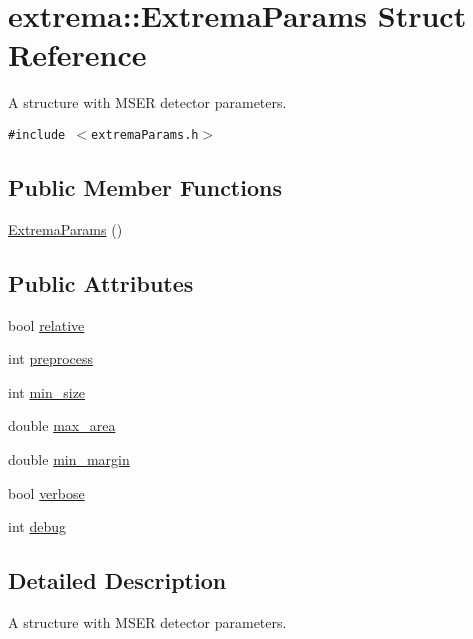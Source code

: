 \hypertarget{structextrema_1_1ExtremaParams}{
\section{extrema::Extrema\-Params Struct Reference}
\label{structextrema_1_1ExtremaParams}
}
A structure with MSER detector parameters.  


{\tt \#include $<$extrema\-Params.h$>$}

\subsection*{Public Member Functions}
\begin{CompactItemize}
\item 
\hyperlink{structextrema_1_1ExtremaParams_8dbdb72d6460a8597dcb5ac435c65e6c}{Extrema\-Params} ()
\end{CompactItemize}
\subsection*{Public Attributes}
\begin{CompactItemize}
\item 
bool \hyperlink{structextrema_1_1ExtremaParams_5992ac98e2ec38d05f315f2ff38f41bb}{relative}
\item 
int \hyperlink{structextrema_1_1ExtremaParams_9fae9c34ce341fdc55f32b100155394f}{preprocess}
\item 
int \hyperlink{structextrema_1_1ExtremaParams_cb1c8a7a543855163eea8fb3b73b6604}{min\_\-size}
\item 
double \hyperlink{structextrema_1_1ExtremaParams_e63ee8f1dac673aa6fcf3709e3239b26}{max\_\-area}
\item 
double \hyperlink{structextrema_1_1ExtremaParams_1b67eb9b4930123fe381830ee951e449}{min\_\-margin}
\item 
bool \hyperlink{structextrema_1_1ExtremaParams_36ed3c175c1d3f5f284a9ae0ae9a9402}{verbose}
\item 
int \hyperlink{structextrema_1_1ExtremaParams_0aa3f18a7996d4f26ae1fb2cd112f8b4}{debug}
\end{CompactItemize}


\subsection{Detailed Description}
A structure with MSER detector parameters. 



